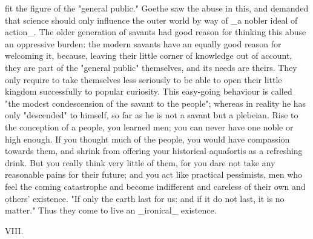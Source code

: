 fit the figure of the "general public." Goethe saw the abuse in this,
and demanded that science should only influence the outer world by
way of _a nobler ideal of action_. The older generation of savants
had good reason for thinking this abuse an oppressive burden: the
modern savants have an equally good reason for welcoming it, because,
leaving their little corner of knowledge out of account, they are
part of the "general public" themselves, and its needs are theirs.
They only require to take themselves less seriously to be able to
open their little kingdom successfully to popular curiosity. This
easy-going behaviour is called "the modest condescension of the
savant to the people"; whereas in reality he has only "descended" to
himself, so far as he is not a savant but a plebeian. Rise to the
conception of a people, you learned men; you can never have one noble
or high enough. If you thought much of the people, you would have
compassion towards them, and shrink from offering your historical
aquafortis as a refreshing drink. But you really think very little of
them, for you dare not take any reasonable pains for their future;
and you act like practical pessimists, men who feel the coming
catastrophe and become indifferent and careless of their own and
others' existence. "If only the earth last for us: and if it do not
last, it is no matter." Thus they come to live an _ironical_
existence.


VIII.

